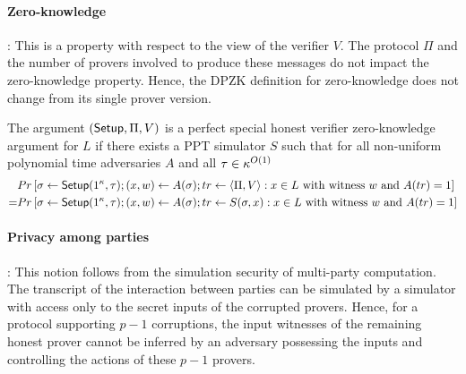 \paragraph{Zero-knowledge}: 
This is a property with respect to the view of the verifier $V$. The protocol $\Pi$ and the number of provers involved to produce these messages do not impact the zero-knowledge property. Hence, the DPZK definition for zero-knowledge does not change from its single prover version.
\begin{definition}
The argument $(\mathsf{Setup}, \Pi, V)$ is a perfect special honest verifier zero-knowledge argument for $L$ if there exists a PPT simulator $S$ such that for all non-uniform polynomial time adversaries $A$ and all $\tau \in {\kappa}^{O(1)}$ 
\begin{align*}
&Pr \left[ \sigma \leftarrow \mathsf{Setup}(1^{\kappa}, \tau); (x,w) \leftarrow A(\sigma); tr \leftarrow \langle \Pi, V \rangle: x \in L \text{ with witness } w \text{ and } A(tr)=1 \right] \\
= &Pr \left[\sigma \leftarrow \mathsf{Setup}(1^{\kappa}, \tau); (x,w) \leftarrow A(\sigma); tr \leftarrow S(\sigma,x): x \in L \text{ with witness } w \text{ and } A(tr) = 1 \right]
\end{align*}
\end{definition}

\paragraph{Privacy among parties}:
This notion follows from the simulation security of multi-party computation. The transcript of the interaction between parties can be simulated by a simulator with access only to the secret inputs of the corrupted provers. Hence, for a protocol supporting $p-1$ corruptions, the input witnesses of the remaining honest prover cannot be inferred by an adversary possessing the inputs and controlling the actions of these $p-1$ provers.

